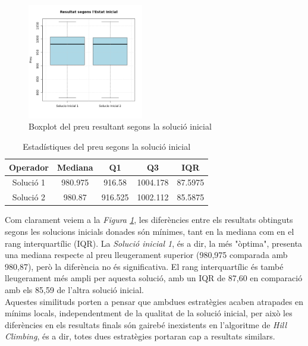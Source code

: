 \documentclass[a4paper]{article}
\begin{document}
	\begin{figure}[H]
		\centering
		\includegraphics[width=0.45\textwidth]{images/exp2_boxplot.png}
		\caption{Boxplot del preu resultant segons la solució inicial}
		\label{fig:exp2_boxplot}
	\end{figure}
	
	\begin{table}[H]
		\centering
		\begin{tabular}{|c|c|c|c|c|}
			\hline
			\textbf{Operador} & \textbf{Mediana} & \textbf{Q1} & \textbf{Q3} & \textbf{IQR} \\
			\hline
			Solució 1 & 980.975 & 916.58 & 1004.178 & 87.5975 \\
			\hline
			Solució 2 & 980.87 & 916.525 & 1002.112 & 85.5875 \\
			\hline
		\end{tabular}
		\caption{Estadístiques del preu segons la solució inicial}
		\label{tab:exp2_estadisticas}
	\end{table}
	
	Com clarament veiem a la \textit{Figura \ref{fig:exp2_boxplot}}, les diferències entre els resultats obtinguts segons les solucions inicials donades són mínimes, tant en la mediana com en el rang interquartílic (IQR). La \textit{Solució inicial 1}, és a dir, la més "òptima", presenta una mediana respecte al preu lleugerament superior (980,975 comparada amb 980,87), però la diferència no és significativa. El rang interquartílic és també lleugerament més ampli per aquesta solució, amb un IQR de 87,60 en comparació amb els 85,59 de l'altra solució inicial.\\
	
	Aquestes similituds porten a pensar que ambdues estratègies acaben atrapades en mínims locals, independentment de la qualitat de la solució inicial, per això les diferències en els resultats finals són gairebé inexistents en l'algoritme de \textit{Hill Climbing}, és a dir, totes dues estratègies portaran cap a resultats similars.\\
	
\end{document}
